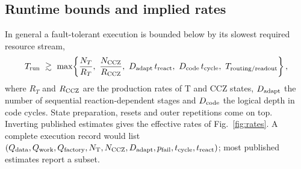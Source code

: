 \documentclass[10pt,a4paper]{article}
\begin{document}
\subsection{Runtime bounds and implied rates}
In general a fault-tolerant execution is bounded below by its slowest required resource stream,
\begin{equation}
T_{\rm run}\ \gtrsim\ \max\!\left\{\frac{N_T}{R_T},\ \frac{N_{\rm CCZ}}{R_{\rm CCZ}},\ D_{\rm adapt}\,t_{\rm react},\ D_{\rm code}\,t_{\rm cycle},\ T_{\rm routing/readout}\right\},
\label{eq:bottleneck}
\end{equation}
where $R_T$ and $R_{\rm CCZ}$ are the production rates of T and CCZ states, $D_{\rm adapt}$ the number of sequential reaction-dependent stages and $D_{\rm code}$ the logical depth in code cycles. State preparation, resets and outer repetitions come on top. Inverting published estimates gives the effective rates of Fig.~\ref{fig:rates}. A complete execution record would list
$(Q_{\rm data}, Q_{\rm work}, Q_{\rm factory}, N_{\rm T}, N_{\rm CCZ}, D_{\rm adapt}, p_{\rm fail}, t_{\rm cycle}, t_{\rm react})$; most published estimates report a subset.
\end{document}
